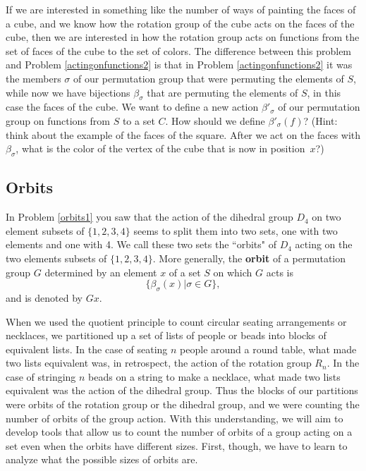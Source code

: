\iteme  If we are interested in something like the number of ways of
painting the faces of a cube, and we know how the rotation group of the
cube acts on the faces of the cube, then we are interested in how the
rotation group acts on functions from the set of faces of the cube to the
set of colors.  The difference between this problem and Problem
\ref{actingonfunctions2} is that in Problem \ref{actingonfunctions2} it
was the members $\sigma$ of our permutation group that were permuting the
elements of $S$, while now we have bijections $\beta_{\sigma}$ that are
permuting the elements of $S$, in this case the faces of the cube.  We
want to define a new action $\beta'_{\sigma}$ of our permutation group on
functions from $S$ to a set $C$.  How should we define
$\beta'_{\sigma}(f)$?  (Hint: think about the example of the faces of the
square.  After we act on the faces with $\beta_{\sigma}$, what is the
color of the vertex of the cube that is now in
position~$x$?)\label{actingonfunctions3}

\ep

\subsection{Orbits} In Problem \ref{orbits1} you saw that the action of
the dihedral group $D_4$ on two element subsets of $\{1,2,3,4\}$ seems to
split them into two sets, one with two elements and one with 4.  We call
these two sets the ``orbits" of $D_4$ acting on the two elements subsets
of $\{1,2,3,4\}$.  More generally, the {\bf orbit} of a
permutation group
$G$  determined by an element $x$ of a set $S$ on which $G$ acts is 
$$\{\beta_{\sigma}(x)| \sigma \in G\},$$ and is denoted by $Gx$. 

When we used the quotient principle to count circular seating
arrangements or necklaces, we partitioned up a set of lists of people or
beads into blocks of equivalent lists.  In the case of seating $n$ people
around a round table, what made two lists equivalent was, in retrospect,
the action of the rotation group $R_n$.  In the case of stringing $n$
beads on a string to make a necklace, what made two lists equivalent was
the action of the dihedral group.  Thus the blocks of our partitions were
orbits of the rotation group or the dihedral group, and we were counting
the number of orbits of the group action.  With this understanding, we
will aim to develop tools that allow us to count the number of orbits
of a group acting on a set even when the orbits have different sizes. 
First, though, we have to learn to analyze what the possible sizes of
orbits are.

